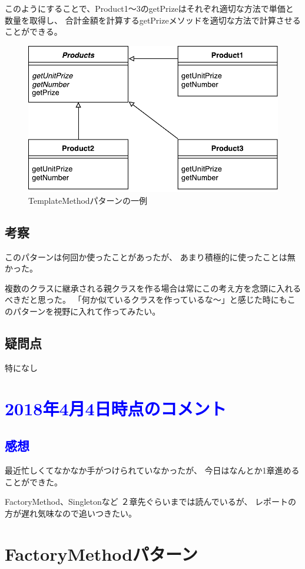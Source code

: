\documentclass[11pt]{jsarticle}
\begin{document}
			このようにすることで、Product1〜3のgetPrizeはそれぞれ適切な方法で単価と数量を取得し、
			合計金額を計算するgetPrizeメソッドを適切な方法で計算させることができる。
			
			\begin{figure}[htbp]
				\centering
				\includegraphics[width = 0.5\hsize]{TemplateMethodPattern.pdf}
				\caption{TemplateMethodパターンの一例}
				\label{fig::TemplateMethod1}
			\end{figure}
			
		\subsection{考察}
			このパターンは何回か使ったことがあったが、
			あまり積極的に使ったことは無かった。
			
			複数のクラスに継承される親クラスを作る場合は常にこの考え方を念頭に入れるべきだと思った。
			「何か似ているクラスを作っているな〜」と感じた時にもこのパターンを視野に入れて作ってみたい。
		
		\subsection{疑問点}
			特になし
		
		\section*{\textcolor{blue}{2018年4月4日時点のコメント}}
		\subsection*{\textcolor{blue}{感想}}
			最近忙しくてなかなか手がつけられていなかったが、
			今日はなんとか1章進めることができた。
			
			FactoryMethod、Singletonなど
			２章先ぐらいまでは読んでいるが、
			レポートの方が遅れ気味なので追いつきたい。
			\clearpage
			
		\section{FactoryMethodパターン}
\end{document}
